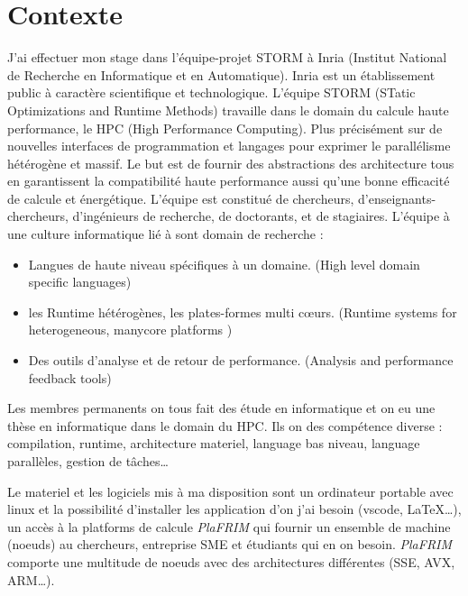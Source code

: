 \section{Contexte}

J'ai effectuer mon stage dans l'équipe-projet STORM à Inria (Institut National de
Recherche en Informatique et en Automatique). Inria est un établissement public à
caractère scientifique et technologique.
L'équipe STORM (STatic Optimizations and Runtime Methods) travaille dans le domain du
calcule haute performance, le HPC (High Performance Computing). Plus précisément sur
de  nouvelles interfaces de programmation et langages pour exprimer le parallélisme
hétérogène et massif. Le but est de fournir des abstractions des architecture tous en
garantissent la compatibilité haute performance aussi qu'une bonne efficacité de calcule
et énergétique.
L'équipe est constitué de chercheurs, d'enseignants-chercheurs, d'ingénieurs de recherche,
de doctorants, et de stagiaires.
L'équipe à une culture informatique lié à sont domain de recherche :

\begin{itemize}
  \item Langues de haute niveau spécifiques à un domaine. (High level domain specific languages)
  \item les Runtime hétérogènes, les plates-formes multi cœurs. (Runtime systems for heterogeneous, manycore platforms )
  \item Des outils d'analyse et de retour de performance. (Analysis and performance feedback tools)
\end{itemize}

Les membres permanents on tous fait des étude en informatique et on eu une thèse en
informatique dans le domain du HPC. Ils on des compétence diverse : compilation, runtime,
architecture materiel, language bas niveau, language parallèles, gestion de tâches\dots

Le materiel et les logiciels mis à ma disposition sont un ordinateur portable avec linux
et la possibilité d'installer les application d'on j'ai besoin (vscode, \LaTeX\dots), un
accès à la platforms de calcule \emph{PlaFRIM} qui fournir un ensemble de machine (noeuds)
au chercheurs, entreprise SME et étudiants qui en on besoin. \emph{PlaFRIM} comporte une
multitude de noeuds avec des architectures différentes (SSE, AVX, ARM\dots).
